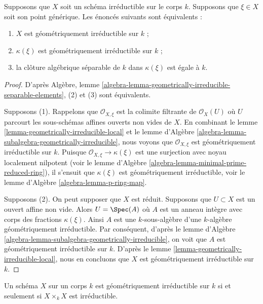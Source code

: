 \begin{lemma}
\label{lemma-geometrically-irreducible-function-field}
Supposons que $X$ soit un schéma irréductible sur le corps $k$. Supposons que
$\xi \in X$ soit son point générique. Les énoncés suivants sont équivalents :
\begin{enumerate}
\item $X$ est géométriquement irréductible sur $k$ ; \item
$\kappa(\xi)$ est géométriquement irréductible sur $k$ ; \item la
clôture algébrique séparable de $k$ dans $\kappa(\xi)$ est égale à $k$.
\end{enumerate}
\end{lemma}

\begin{proof}
D'après Algèbre, lemme
\ref{algebra-lemma-geometrically-irreducible-separable-elements},
(2) et (3) sont équivalents.

\medskip\noindent
Supposons (1). Rappelons que $\mathcal{O}_{X, \xi}$ est
la colimite filtrante de $\mathcal{O}_X(U)$ où $U$
parcourt les sous-schémas affines ouverts non vides de
$X$. En combinant le lemme
\ref{lemma-geometrically-irreducible-local} et le lemme
d'Algèbre
\ref{algebra-lemma-subalgebra-geometrically-irreducible}, nous voyons
que $\mathcal{O}_{X, \xi}$ est géométriquement irréductible sur $k$.
Puisque $\mathcal{O}_{X, \xi} \to \kappa(\xi)$ est une surjection avec
noyau localement nilpotent (voir le lemme d'Algèbre
\ref{algebra-lemma-minimal-prime-reduced-ring}), il s'ensuit que $\kappa(\xi)$ est
géométriquement irréductible, voir le lemme d'Algèbre \ref{algebra-lemma-p-ring-map}.

\medskip\noindent
Supposons (2). On peut supposer que $X$ est réduit. Supposons que
$U \subset X$ est un ouvert affine non vide. Alors $U = \Spec(A)$ où $A$
est un anneau intègre avec corps des fractions $\kappa(\xi)$. Ainsi $A$ est
une $k$-sous-algèbre d'une $k$-algèbre géométriquement irréductible. Par
conséquent, d'après le lemme d'Algèbre
\ref{algebra-lemma-subalgebra-geometrically-irreducible}, on voit que $A$ est
géométriquement irréductible sur $k$. D'après le lemme
\ref{lemma-geometrically-irreducible-local}, nous en concluons que $X$ est géométriquement irréductible sur $k$.
\end{proof}

\begin{lemma}
\label{lemma-geometrically-irreducible-self-product}
Un schéma $X$ sur un corps $k$ est géométriquement
irréductible sur $k$ si et seulement si $X\times_k X$ est irréductible.
\end{lemma}

